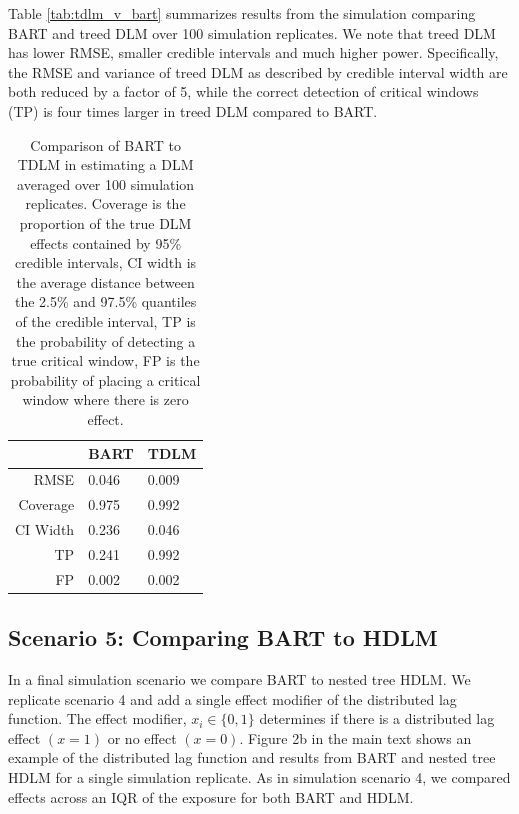 \documentclass[12pt]{article}
\begin{document}
Table \ref{tab:tdlm_v_bart} summarizes results from the simulation comparing BART and treed DLM over 100 simulation replicates. We note that treed DLM has lower RMSE, smaller credible intervals and much higher power. Specifically, the RMSE and variance of treed DLM as described by credible interval width are both reduced by a factor of 5, while the correct detection of critical windows (TP) is four times larger in treed DLM compared to BART.


\begin{table}[!ht]
    \caption{Comparison of BART to TDLM in estimating a DLM averaged over 100 simulation replicates. Coverage is the proportion of the true DLM effects contained by 95\% credible intervals, CI width is the average distance between the 2.5\% and 97.5\% quantiles of the credible interval, TP is the probability of detecting a true critical window, FP is the probability of placing a critical window where there is zero effect.}
    \label{tab:hdlm_v_bart}
    \centering
    \begin{tabular}{rll}
    \toprule[2pt]
            & BART & TDLM\\
            \midrule
         RMSE & 0.046 & 0.009\\
         Coverage & 0.975 & 0.992\\
         CI Width & 0.236 & 0.046\\
         TP & 0.241 & 0.992\\
         FP & 0.002 & 0.002\\
         \bottomrule[2pt]
    \end{tabular}
\end{table}






\subsection{Scenario 5: Comparing BART to HDLM}
In a final simulation scenario we compare BART to nested tree HDLM. We replicate scenario 4 and add a single effect modifier of the distributed lag function. The effect modifier, $x_i\in\{0,1\}$ determines if there is a distributed lag effect $(x=1)$ or no effect $(x=0)$. Figure 2b in the main text shows an example of the distributed lag function and results from BART and nested tree HDLM for a single simulation replicate. As in simulation scenario 4, we compared effects across an IQR of the exposure for both BART and HDLM.
\end{document}
